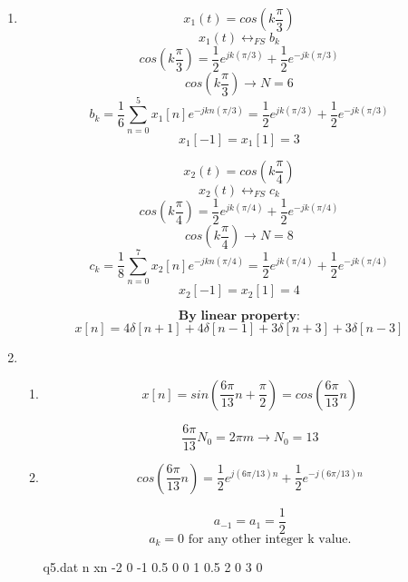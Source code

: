 \documentclass[10pt,a4paper, margin=1in]{article}
\begin{document}
\begin{enumerate}
\item %
\[x_1(t) = cos(k\frac{\pi}{3}) \]
\[x_1(t)  \longleftrightarrow_{FS} b_k\]
\[cos(k\frac{\pi}{3}) = \frac{1}{2} e^{jk(\pi/3)} + \frac{1}{2} e^{-jk(\pi/3)}\]
\[cos(k\frac{\pi}{3})  \rightarrow N = 6 \]
\[b_k = \frac{1}{6}\sum_{n=0}^5x_1[n]e^{-jkn(\pi/3)} = \frac{1}{2} e^{jk(\pi/3)} + \frac{1}{2} e^{-jk(\pi/3)}\]
\[x_1[-1] = x_1[1] = 3 \]


\[x_2(t) = cos(k\frac{\pi}{4})\]
\[x_2(t)  \longleftrightarrow_{FS} c_k\]
\[cos(k\frac{\pi}{4}) = \frac{1}{2} e^{jk(\pi/4)} + \frac{1}{2} e^{-jk(\pi/4)}\]
\[cos(k\frac{\pi}{4})  \rightarrow N = 8\]
\[c_k = \frac{1}{8}\sum_{n=0}^7x_2[n]e^{-jkn(\pi/4)} = \frac{1}{2} e^{jk(\pi/4)} + \frac{1}{2} e^{-jk(\pi/4)} \]
\[x_2[-1] = x_2[1] = 4 \] 

\[ \textbf{By linear property:}\]
\[ x[n] = 4\delta[n+1] + 4\delta[n-1] + 3\delta[n+3] + 3\delta[n-3] \]



\item %
    \begin{enumerate}   
    
    
    
    \item %
    \[x[n] = sin(\frac{6\pi}{13}n + \frac{\pi}{2}) = cos(\frac{6\pi}{13}n)\]
    
    \[\frac{6\pi}{13}N_0 = 2\pi m  \rightarrow N_0 = 13 \]
    
    \item %
    \[cos(\frac{6\pi}{13}n) = \frac{1}{2} e^{j(6\pi/13)n} + \frac{1}{2} e^{-j(6\pi/13)n}\]

    \[a_{-1} = a_1 = \frac{1}{2} \]
    \[ a_k = 0 \text{ for any other integer k value.} \]

    
\begin{filecontents}{q5.dat}
 n   xn 
 -2  0
 -1  0.5  
 0   0
 1  0.5
 2  0
 3  0
 
\end{filecontents}

\begin{figure} [h!]
    \centering
    \label{fig:q3}
\end{figure}
        

\end{enumerate}
\end{enumerate}
\end{document}
